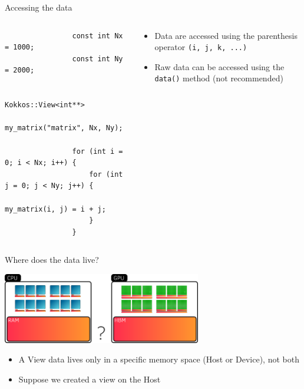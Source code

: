 \documentclass[aspectratio=169]{beamer}
\begin{document}
\begin{frame}[fragile]{Accessing the data}
    \begin{columns}
        \begin{column}{0.6\linewidth}
            \begin{verbatim}
                const int Nx = 1000;
                const int Ny = 2000;

                Kokkos::View<int**>
                    my_matrix("matrix", Nx, Ny);

                for (int i = 0; i < Nx; i++) {
                    for (int j = 0; j < Ny; j++) {
                        my_matrix(i, j) = i + j;
                    }
                }
            \end{verbatim}
        \end{column}
        \begin{column}{0.4\linewidth}
            \begin{itemize}
                \item Data are accessed using the parenthesis operator \texttt{(i, j, k, ...)}
                \item Raw data can be accessed using the \texttt{data()} method (not recommended)
            \end{itemize}
        \end{column}
    \end{columns}
\end{frame}


\begin{frame}{Where does the data live?}
    \begin{center}
        \includegraphics[width=0.65\textwidth]{view_memory.png}
    \end{center}
    \begin{itemize}
        \item A View data lives only in a specific memory space (Host or Device), not both
        \item Suppose we created a view on the Host
    \end{itemize}
\end{frame}
\end{document}
